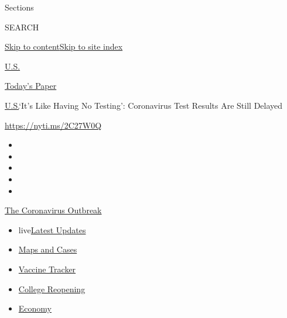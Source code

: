 Sections

SEARCH

\protect\hyperlink{site-content}{Skip to
content}\protect\hyperlink{site-index}{Skip to site index}

\href{https://www.nytimes.com/section/us}{U.S.}

\href{https://myaccount.nytimes.com/auth/login?response_type=cookie\&client_id=vi}{}

\href{https://www.nytimes.com/section/todayspaper}{Today's Paper}

\href{/section/us}{U.S.}\textbar{}`It's Like Having No Testing':
Coronavirus Test Results Are Still Delayed

\url{https://nyti.ms/2C27W0Q}

\begin{itemize}
\item
\item
\item
\item
\item
\end{itemize}

\href{https://www.nytimes.com/news-event/coronavirus?action=click\&pgtype=Article\&state=default\&region=TOP_BANNER\&context=storylines_menu}{The
Coronavirus Outbreak}

\begin{itemize}
\tightlist
\item
  live\href{https://www.nytimes.com/2020/08/04/world/coronavirus-cases.html?action=click\&pgtype=Article\&state=default\&region=TOP_BANNER\&context=storylines_menu}{Latest
  Updates}
\item
  \href{https://www.nytimes.com/interactive/2020/us/coronavirus-us-cases.html?action=click\&pgtype=Article\&state=default\&region=TOP_BANNER\&context=storylines_menu}{Maps
  and Cases}
\item
  \href{https://www.nytimes.com/interactive/2020/science/coronavirus-vaccine-tracker.html?action=click\&pgtype=Article\&state=default\&region=TOP_BANNER\&context=storylines_menu}{Vaccine
  Tracker}
\item
  \href{https://www.nytimes.com/2020/08/02/us/covid-college-reopening.html?action=click\&pgtype=Article\&state=default\&region=TOP_BANNER\&context=storylines_menu}{College
  Reopening}
\item
  \href{https://www.nytimes.com/live/2020/08/04/business/stock-market-today-coronavirus?action=click\&pgtype=Article\&state=default\&region=TOP_BANNER\&context=storylines_menu}{Economy}
\end{itemize}

